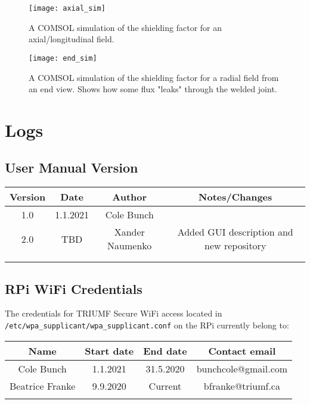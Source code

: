 \documentclass{TheMartianReport}
\newcommand{\pyinline}[1]{\texttt{#1}}
\begin{document}
\begin{figure}[h]
	\centering
	\texttt{[image: axial\_sim]}
	\caption{A COMSOL simulation of the shielding factor for an axial/longitudinal field.}
	\label{fig:AxialSim}
\end{figure}

\begin{figure}[h]
	\centering
	\texttt{[image: end\_sim]}
	\caption{A COMSOL simulation of the shielding factor for a radial field from an end view. Shows how some flux "leaks" through the welded joint.}
	\label{fig:EndSim}
\end{figure}

\pagebreak[18]

\section{Logs}

\subsection{User Manual Version}
\begin{table}[h]
	\centering
	\begin{tabular}{|c|c|c|c|}
		\hline
		\textbf{Version} & \textbf{Date} & \textbf{Author} & \textbf{Notes/Changes} \\
		\hline
		1.0 & 1.1.2021 & Cole Bunch &  \\
		\hline
		2.0 & TBD & Xander Naumenko &  Added GUI description and new repository\\
		\hline
		&  &  &  \\
		\hline
		&  &  &  \\
		\hline
	\end{tabular}
	\label{log:ManVer}
\end{table}

\subsection{RPi WiFi Credentials}
The credentials for TRIUMF Secure WiFi access located in \pyinline{/etc/wpa_supplicant/wpa_supplicant.conf} on the RPi currently belong to:
\begin{table}[h]
	\centering
\begin{tabular}{|c|c|c|c|}
	\hline
	\textbf{Name} & \textbf{Start date} & \textbf{End date} & \textbf{Contact email} \\
	\hline
	Cole Bunch & 1.1.2021 & 31.5.2020 & bunchcole@gmail.com \\
	\hline
	Beatrice Franke & 9.9.2020 & Current & bfranke@triumf.ca \\
	\hline
	&  &  &  \\
	\hline
\end{tabular}
\label{log:WiFi}
\end{table}
\end{document}
